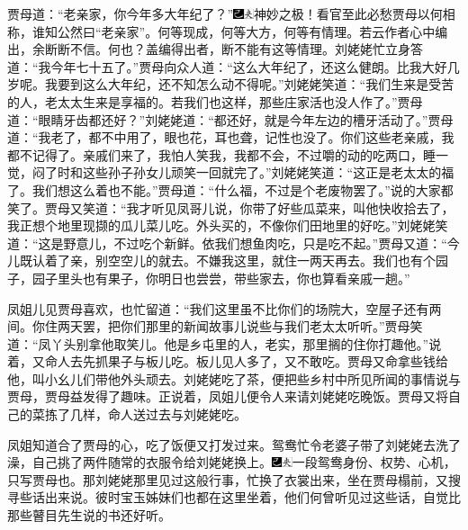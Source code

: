 贾母道：``老亲家，你今年多大年纪了？''{\includegraphics[width=3mm]{../Images/00003}\includegraphics[width=3mm]{../Images/00012}\footnotesize \kaishu 神妙之极！看官至此必愁贾母以何相称，谁知公然曰``老亲家''。何等现成，何等大方，何等有情理。若云作者心中编出，余断断不信。何也？盖编得出者，断不能有这等情理。}刘姥姥忙立身答道：``我今年七十五了。''贾母向众人道：``这么大年纪了，还这么健朗。比我大好几岁呢。我要到这么大年纪，还不知怎么动不得呢。''刘姥姥笑道：``我们生来是受苦的人，老太太生来是享福的。若我们也这样，那些庄家活也没人作了。''贾母道：``眼睛牙齿都还好？''刘姥姥道：``都还好，就是今年左边的槽牙活动了。''贾母道：``我老了，都不中用了，眼也花，耳也聋，记性也没了。你们这些老亲戚，我都不记得了。亲戚们来了，我怕人笑我，我都不会，不过嚼的动的吃两口，睡一觉，闷了时和这些孙子孙女儿顽笑一回就完了。''刘姥姥笑道：``这正是老太太的福了。我们想这么着也不能。''贾母道：``什么福，不过是个老废物罢了。''说的大家都笑了。贾母又笑道：``我才听见凤哥儿说，你带了好些瓜菜来，叫他快收拾去了，我正想个地里现撷的瓜儿菜儿吃。外头买的，不像你们田地里的好吃。''刘姥姥笑道：``这是野意儿，不过吃个新鲜。依我们想鱼肉吃，只是吃不起。''贾母又道：``今儿既认着了亲，别空空儿的就去。不嫌我这里，就住一两天再去。我们也有个园子，园子里头也有果子，你明日也尝尝，带些家去，你也算看亲戚一趟。''

凤姐儿见贾母喜欢，也忙留道：``我们这里虽不比你们的场院大，空屋子还有两间。你住两天罢，把你们那里的新闻故事儿说些与我们老太太听听。''贾母笑道：``凤丫头别拿他取笑儿。他是乡屯里的人，老实，那里搁的住你打趣他。''说着，又命人去先抓果子与板儿吃。板儿见人多了，又不敢吃。贾母又命拿些钱给他，叫小幺儿们带他外头顽去。刘姥姥吃了茶，便把些乡村中所见所闻的事情说与贾母，贾母益发得了趣味。正说着，凤姐儿便令人来请刘姥姥吃晚饭。贾母又将自己的菜拣了几样，命人送过去与刘姥姥吃。

凤姐知道合了贾母的心，吃了饭便又打发过来。鸳鸯忙令老婆子带了刘姥姥去洗了澡，自己挑了两件随常的衣服令给刘姥姥换上。{\includegraphics[width=3mm]{../Images/00003}\includegraphics[width=3mm]{../Images/00012}\footnotesize \kaishu 一段鸳鸯身份、权势、心机，只写贾母也。}那刘姥姥那里见过这般行事，忙换了衣裳出来，坐在贾母榻前，又搜寻些话出来说。彼时宝玉姊妹们也都在这里坐着，他们何曾听见过这些话，自觉比那些瞽目先生说的书还好听。


